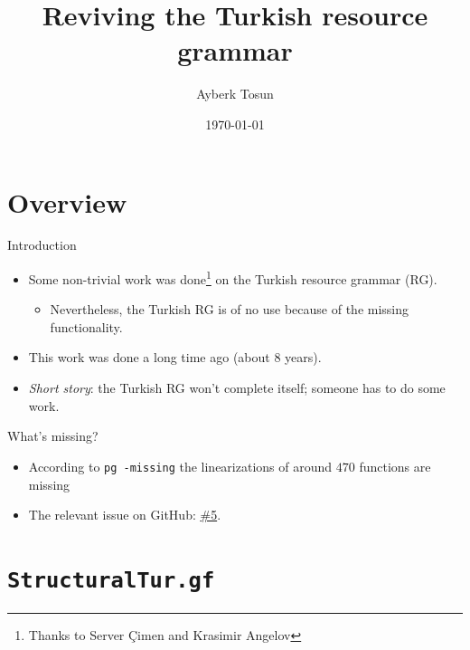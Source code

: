 \documentclass{beamer}
\title{Reviving the Turkish resource grammar}
\date{\today}
\author{Ayberk Tosun}
\institute{Fifth GF Summer School}
\newcommand{\issuelink}{https://github.com/GrammaticalFramework/GF/issues/5}
\begin{document}
  \maketitle

  \section{Overview}

  \begin{frame}{Introduction}
    \begin{itemize}
      \item<1-> Some non-trivial work was done\footnote{Thanks to Server
        \c{C}imen and Krasimir Angelov} on the Turkish resource grammar (RG).
        \begin{itemize}
          \item<2-> Nevertheless, the Turkish RG is of no use
            because of the missing functionality.
        \end{itemize}
      \item<3-> This work was done a long time ago (about $8$ years).
      \item<4-> \emph{Short story}: the Turkish RG won't complete
        itself; someone has to do some work.
    \end{itemize}
  \end{frame}

  \begin{frame}{What's missing?}
    \begin{itemize}
      \item<1-> According to \texttt{pg -missing} the linearizations of around
        $470$ functions are missing
      \item<2-> The relevant issue on GitHub: \href{\issuelink}{\alert{\#5}}.
    \end{itemize}
  \end{frame}

  \section{\texttt{StructuralTur.gf}}
\end{document}
